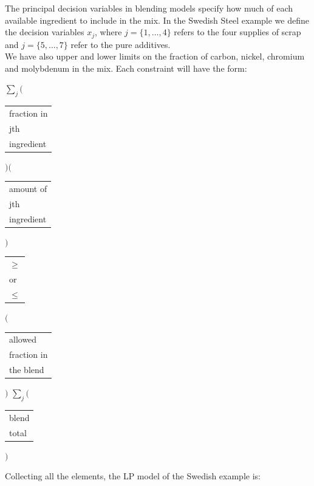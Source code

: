 \documentclass[a4paper,10 pt,titlepage,twoside]{book}
\theoremstyle{plain}
\theoremstyle{definition}
\theoremstyle{remark}
\begin{document}
The principal decision variables in blending models specify how much of each available ingredient to include in the mix. In the Swedish Steel example we define the decision variables $x_{j}$, where $j = \{1, \dots, 4\}$ refers to the four supplies of scrap and $j = \{5, \dots, 7\}$ refer to the pure additives.\\
We have also upper and lower limits on the fraction of carbon, nickel, chromium and molybdenum in the mix. Each constraint will have the form:\\
\begin{center}
$\sum\limits_{j}\Bigg($\begin{tabular}{l}
 fraction in\\
jth\\
ingredient\\
\end{tabular}
$\Bigg)$$\Bigg($\begin{tabular}{l}
 amount of\\
jth\\
ingredient\\
\end{tabular}$\Bigg)$
\begin{tabular}{l}
	$\geq$\\
	or\\
	$\leq$\\
\end{tabular}
	$\Bigg($\begin{tabular}{l}
		allowed\\
		fraction in\\
		the blend\\
	\end{tabular}
	$\Bigg)$
	$\sum\limits_{j}\Big($\begin{tabular}{l}
		blend\\
		total\\
	\end{tabular}
	$\Big)$
\end{center}		
\bigskip
Collecting all the elements, the LP model of the Swedish example is: 
\end{document}
